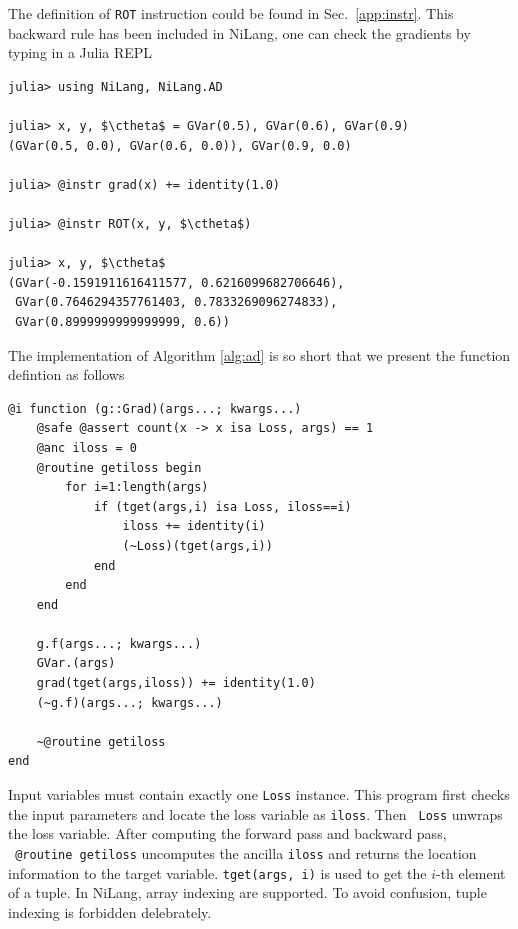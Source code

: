 \documentclass[aps,twocolumn,longbibliography,english,superscriptaddress]{revtex4-1}
\newcommand{\<}{\langle}
\renewcommand{\>}{\rangle}
\newcommand{\ctheta}{{\color{jlbase}{\rm \theta}}}
\newcommand{\Sec}[1]{Sec.~\ref{#1}}
\theoremstyle{definition}\newtheorem{definition}{\textit{Definition}}
\begin{document}
The definition of \texttt{ROT} instruction could be found in \Sec{app:instr}. This backward rule has been included in NiLang, one can check the gradients by typing in a Julia REPL

\begin{minipage}{.44\textwidth}
    \begin{lstlisting}[mathescape=true]
julia> using NiLang, NiLang.AD

julia> x, y, $\ctheta$ = GVar(0.5), GVar(0.6), GVar(0.9)
(GVar(0.5, 0.0), GVar(0.6, 0.0)), GVar(0.9, 0.0)

julia> @instr grad(x) += identity(1.0)

julia> @instr ROT(x, y, $\ctheta$)

julia> x, y, $\ctheta$
(GVar(-0.1591911616411577, 0.6216099682706646),
 GVar(0.7646294357761403, 0.7833269096274833),
 GVar(0.8999999999999999, 0.6))
\end{lstlisting}
\end{minipage}


The implementation of Algorithm \ref{alg:ad} is so short that we present the function defintion as follows

\begin{minipage}{.44\textwidth}
\begin{lstlisting}
@i function (g::Grad)(args...; kwargs...)
    @safe @assert count(x -> x isa Loss, args) == 1
    @anc iloss = 0
    @routine getiloss begin
        for i=1:length(args)
            if (tget(args,i) isa Loss, iloss==i)
                iloss += identity(i)
                (~Loss)(tget(args,i))
            end
        end
    end

    g.f(args...; kwargs...)
    GVar.(args)
    grad(tget(args,iloss)) += identity(1.0)
    (~g.f)(args...; kwargs...)

    ~@routine getiloss
end
\end{lstlisting}
\end{minipage}

Input variables must contain exactly one \texttt{Loss} instance.
This program first checks the input parameters and locate the loss variable as \texttt{iloss}. Then \texttt{~Loss} unwraps the loss variable.
After computing the forward pass and backward pass, \texttt{~@routine getiloss} uncomputes the ancilla \texttt{iloss} and returns the location information to the target variable.
\texttt{tget(args, i)} is used to get the $i$-th element of a tuple.
In NiLang, array indexing are supported. To avoid confusion, tuple indexing is forbidden delebrately.
\end{document}
